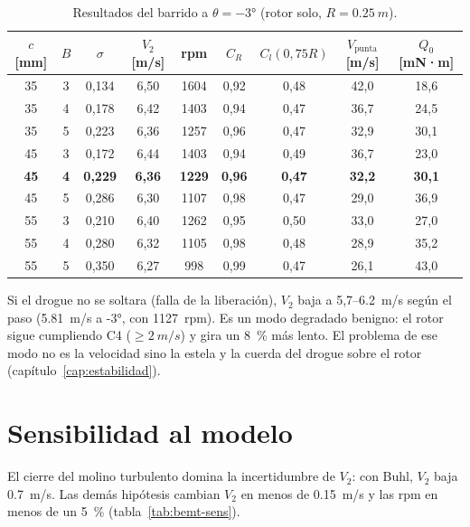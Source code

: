 \begin{table}[H]
\centering
\caption{Resultados del barrido a $\theta=\ang{-3}$ (rotor solo, $R=\SI{0.25}{m}$).}
\label{tab:bemt-barrido}
\begin{tabular}{ccccccccc}
\toprule
$c$ [mm] & $B$ & $\sigma$ & $V_2$ [m/s] & rpm & $C_R$ & $C_l(0{,}75R)$ & $V_\text{punta}$ [m/s] & $Q_0$ [mN·m] \\
\midrule
35 & 3 & 0,134 & 6,50 & \num{1604} & 0,92 & 0,48 & 42,0 & 18,6 \\
35 & 4 & 0,178 & 6,42 & \num{1403} & 0,94 & 0,47 & 36,7 & 24,5 \\
35 & 5 & 0,223 & 6,36 & \num{1257} & 0,96 & 0,47 & 32,9 & 30,1 \\
45 & 3 & 0,172 & 6,44 & \num{1403} & 0,94 & 0,49 & 36,7 & 23,0 \\
\textbf{45} & \textbf{4} & \textbf{0,229} & \textbf{6,36} & \textbf{\num{1229}} & \textbf{0,96} & \textbf{0,47} & \textbf{32,2} & \textbf{30,1} \\
45 & 5 & 0,286 & 6,30 & \num{1107} & 0,98 & 0,47 & 29,0 & 36,9 \\
55 & 3 & 0,210 & 6,40 & \num{1262} & 0,95 & 0,50 & 33,0 & 27,0 \\
55 & 4 & 0,280 & 6,32 & \num{1105} & 0,98 & 0,48 & 28,9 & 35,2 \\
55 & 5 & 0,350 & 6,27 & \num{998} & 0,99 & 0,47 & 26,1 & 43,0 \\
\bottomrule
\end{tabular}
\end{table}

Si el drogue no se soltara (falla de la liberación), $V_2$ baja a 5,7--\SI{6.2}{m/s} según
el paso (\SI{5.81}{m/s} a \ang{-3}, con \num{1127}~rpm). Es un modo degradado benigno: el
rotor sigue cumpliendo C4 ($\ge\SI{2}{m/s}$) y gira un \SI{8}{\percent} más lento. El
problema de ese modo no es la velocidad sino la estela y la cuerda del drogue
sobre el rotor (capítulo~\ref{cap:estabilidad}).

\section{Sensibilidad al modelo}\label{sec:bemt-sens}

El cierre del molino turbulento domina la incertidumbre de $V_2$: con Buhl, $V_2$ baja
\SI{0.7}{m/s}. Las demás hipótesis cambian $V_2$ en menos de \SI{0.15}{m/s} y las rpm en
menos de un \SI{5}{\percent} (tabla~\ref{tab:bemt-sens}).

